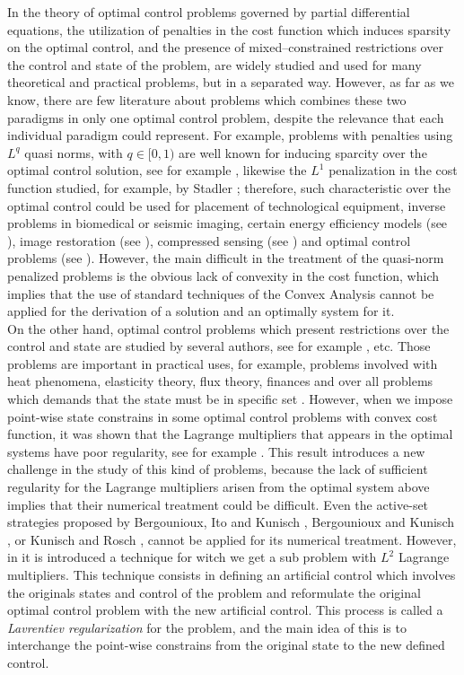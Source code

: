 \documentclass[11pt,a4paper]{amsart}
\begin{document}
In the theory of optimal control problems governed by partial differential equations, the utilization of penalties in the cost function which induces sparsity on the optimal control, and the presence of mixed--constrained restrictions over the control and state of the problem, are widely studied and used for many theoretical and practical problems, but in a separated way. However, as far as we know, there are few literature about problems which combines these two paradigms in only one optimal control problem, despite the relevance that each individual paradigm could represent. For example, problems with penalties using $L^q$ quasi norms, with $q\in [0,1)$ are well known for inducing sparcity over the optimal control solution, see for example \cite{ito-kunish, merino}, likewise the $L^1$ penalization in the cost function studied, for example, by Stadler \cite{stadler}; therefore, such characteristic over the optimal control could be used for placement of technological equipment, inverse problems in biomedical or seismic imaging, certain energy efficiency models (see \cite{vogel}), image restoration (see \cite{hinttv}), compressed sensing (see \cite{donoho}) and optimal control problems (see \cite{casas}). However, the main difficult in the treatment of the quasi-norm penalized problems is the obvious lack of convexity in the cost function, which implies that the use of standard techniques of the Convex Analysis cannot be applied for the derivation of a solution and an optimally system for it.\\ 

On the other hand, optimal control problems which present restrictions over the control and state are studied by several authors, see for example \cite{casas, casas-kunisch, casas-delosreyes}, etc. Those problems are important in practical uses, for example, problems involved with heat phenomena, elasticity theory, flux theory, finances and over all problems which demands that the state must be in specific set \cite{hintkun}. However, when we impose point-wise state constrains in some optimal control problems with convex cost function, it was shown that the Lagrange multipliers that appears in the optimal systems have poor regularity, see for example \cite{casas, casas-delosreyes}. This result introduces a new challenge in the study of this kind of problems, because the lack of sufficient regularity for the Lagrange multipliers arisen from the optimal system above implies that their numerical treatment could be difficult. Even the active-set strategies proposed by Bergounioux, Ito and Kunisch \cite{bik}, Bergounioux and Kunisch \cite{bk}, or Kunisch and Rosch \cite{kr}, cannot be applied for its numerical treatment. However, in \cite{meyer1} it is introduced a technique for witch we get a sub problem with $L^2$ Lagrange multipliers. This technique consists in defining an artificial control which involves the originals states and control of the problem and reformulate the original optimal control problem with the new artificial control. This process is called a \textit{Lavrentiev regularization} for the problem, and the main idea of this is to interchange the point-wise constrains from the original state to the new defined control.\\
\end{document}
